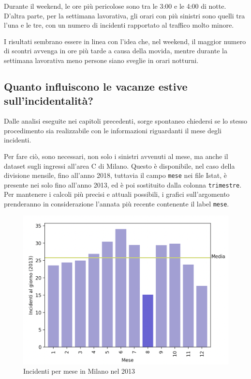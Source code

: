 \documentclass[a4paper,12pt]{report}
\newcommand{\columnstyle}[1]{\texttt{#1}}
\begin{document}
Durante il weekend, le ore più pericolose sono tra le 3:00 e le 4:00 di notte. 
D'altra parte, per la settimana lavorativa, gli orari con più sinistri sono quelli 
tra l'una e le tre, con un numero di incidenti rapportato al 
traffico molto minore. 

I risultati sembrano essere in linea con l'idea che, nel weekend, il maggior 
numero di scontri avvenga in ore più tarde a causa della movida, mentre durante 
la settimana lavorativa meno persone siano sveglie in orari notturni. 

\subsection{Quanto influiscono le vacanze estive sull'incidentalità?}

Dalle analisi eseguite nei capitoli precedenti, sorge spontaneo chiedersi se lo stesso 
procedimento sia realizzabile con le informazioni riguardanti il mese degli 
incidenti. 

Per fare ciò, sono necessari, non solo i sinistri avvenuti al mese, 
ma anche il dataset sugli ingressi all'area C di Milano. 
Questo è disponibile, nel caso della divisione 
mensile, fino all'anno 2018, tuttavia il campo \columnstyle{mese} nei file Istat, è 
presente nei solo fino all'anno 2013, ed è poi sostituito 
dalla colonna \columnstyle{trimestre}. 
Per mantenere i calcoli più precisi e attuali possibili, i grafici sull'argomento prenderanno 
in considerazione l'annata più recente contenente il label \columnstyle{mese}. 

\begin{figure}
    \hfill\includegraphics[width=0.7\linewidth]{../src/incidenti/incidenti_senza_coords/mese_incidenti/milano_mese.png}\hspace*{\fill}
    \caption{Incidenti per mese in Milano nel 2013}
    \label{fig:milano-mese}
\end{figure}
\end{document}
